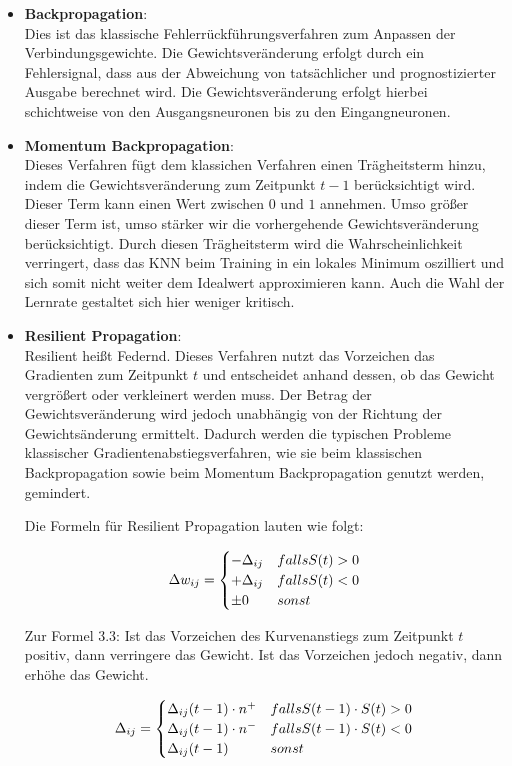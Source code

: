 \begin{itemize}
\item \textbf{Backpropagation}:\\
Dies ist das klassische Fehlerrückführungsverfahren zum Anpassen der Verbindungsgewichte. Die Gewichtsveränderung erfolgt durch ein Fehlersignal, dass aus der Abweichung von tatsächlicher und prognostizierter Ausgabe berechnet wird. Die Gewichtsveränderung erfolgt hierbei schichtweise von den Ausgangsneuronen bis zu den Eingangneuronen.

\item \textbf{Momentum Backpropagation}:\\
Dieses Verfahren fügt dem klassichen Verfahren einen Trägheitsterm hinzu, indem die Gewichtsveränderung zum Zeitpunkt $t-1$ berücksichtigt wird. Dieser Term kann einen Wert zwischen $0$ und $1$ annehmen. Umso größer dieser Term ist, umso stärker wir die vorhergehende Gewichtsveränderung berücksichtigt. Durch diesen Trägheitsterm wird die Wahrscheinlichkeit verringert, dass das KNN beim Training in ein lokales Minimum oszilliert und sich somit nicht weiter dem Idealwert approximieren kann. Auch die Wahl der Lernrate gestaltet sich hier weniger kritisch. 

\item \textbf{Resilient Propagation}:\\
Resilient heißt Federnd. Dieses Verfahren nutzt das Vorzeichen das Gradienten zum Zeitpunkt $t$ und entscheidet anhand dessen, ob das Gewicht vergrößert oder verkleinert werden muss. Der Betrag der Gewichtsveränderung wird jedoch unabhängig von der Richtung der Gewichtsänderung ermittelt.  Dadurch werden die typischen Probleme klassischer Gradientenabstiegsverfahren, wie sie beim klassischen Backpropagation sowie beim Momentum Backpropagation genutzt werden, gemindert.

Die Formeln für Resilient Propagation lauten wie folgt:

\begin{equation}\formelentry{Formel zur Bestimmung der Art der Gewichtsänderung}
\Delta w_{ij}=\begin{cases} 
-\Delta_{ij} & falls S(t) > 0 \\ 
+\Delta_{ij} & falls S(t) < 0  \\ 
\pm 0       & sonst 
\end{cases}
\end{equation}

Zur Formel 3.3: Ist das Vorzeichen des Kurvenanstiegs zum Zeitpunkt $t$ positiv, dann
verringere das Gewicht. Ist das Vorzeichen jedoch negativ, dann erhöhe das Gewicht.

\begin{equation}\formelentry{Formel zur Bestimmung des Betrages der Gewichtsänderung}
\Delta_{ij}=\begin{cases} 
\Delta_{ij}(t-1)\cdot n^+ & falls S(t-1) \cdot S(t) > 0 \\ 
\Delta_{ij}(t-1)\cdot n^- & falls S(t-1) \cdot S(t) < 0 \\
\Delta_{ij}(t-1)       & sonst 
\end{cases}
\end{equation}

\end{itemize}

